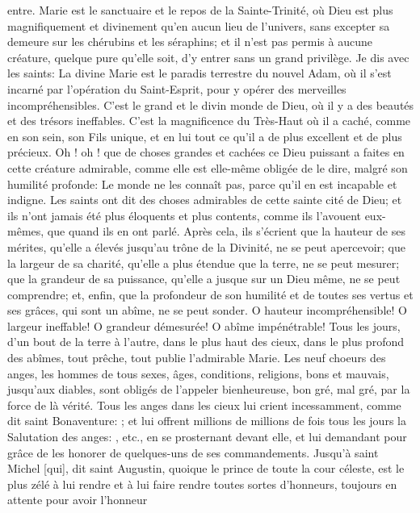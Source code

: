 entre. Marie est le sanctuaire et le repos de la Sainte-Trinité, où Dieu est plus magnifiquement et divinement qu'en
aucun lieu de l'univers, sans excepter sa demeure sur les chérubins et les séraphins; et il n'est pas permis à
aucune créature, quelque pure qu'elle soit, d'y entrer sans un grand privilège.
 Je dis avec les saints: La divine Marie est le paradis terrestre du nouvel Adam, où il s'est incarné par l'opération
du Saint-Esprit, pour y opérer des merveilles incompréhensibles. C'est le grand et le divin monde de Dieu, où il y a
des beautés et des trésors ineffables. C'est la magnificence du Très-Haut où il a caché, comme en son sein, son
Fils unique, et en lui tout ce qu'il a de plus excellent et de plus précieux. Oh ! oh ! que de choses grandes et
cachées ce Dieu puissant a faites en cette créature admirable, comme elle est elle-même obligée de le dire,
malgré son humilité profonde:  Le monde ne les connaît pas, parce qu'il en est
incapable et indigne.
 Les saints ont dit des choses admirables de cette sainte cité de Dieu; et ils n'ont jamais été plus éloquents et
plus contents, comme ils l'avouent eux-mêmes, que quand ils en ont parlé. Après cela, ils s'écrient que la hauteur
de ses mérites, qu'elle a élevés jusqu'au trône de la Divinité, ne se peut apercevoir; que la largeur de sa charité,
qu'elle a plus étendue que la terre, ne se peut mesurer; que la grandeur de sa puissance, qu'elle a jusque sur un
Dieu même, ne se peut comprendre; et, enfin, que la profondeur de son humilité et de toutes ses vertus et ses
grâces, qui sont un abîme, ne se peut sonder. O hauteur incompréhensible! O largeur ineffable! O grandeur
démesurée! O abîme impénétrable!
 Tous les jours, d'un bout de la terre à l'autre, dans le plus haut des cieux, dans le plus profond des abîmes, tout
prêche, tout publie l'admirable Marie. Les neuf choeurs des anges, les hommes de tous sexes, âges, conditions,
religions, bons et mauvais, jusqu'aux diables, sont obligés de l'appeler bienheureuse, bon gré, mal gré, par la force
de là vérité. Tous les anges dans les cieux lui crient incessamment, comme dit saint Bonaventure: ; et lui offrent millions de millions de fois tous les jours la Salutation des anges:
, etc., en se prosternant devant elle, et lui demandant pour grâce de les honorer de quelques-uns de
ses commandements. Jusqu'à saint Michel [qui], dit saint Augustin, quoique le prince de toute la cour céleste, est
le plus zélé à lui rendre et à lui faire rendre toutes sortes d'honneurs, toujours en attente pour avoir l'honneur
